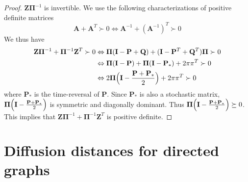 \begin{proof}
  $\mathbf{Z}\bm{\Pi}^{-1}$ is invertible. We use the
  following characterizations of positive definite matrices
  \citep[see][\S
  1.2]{boley09:_gener_laplac,horn94:_topic_in_matrix_analy}
  \begin{equation}
    \label{eq:74}
    \mathbf{A} + \mathbf{A}^{T} \succ 0 \Leftrightarrow
    \mathbf{A}^{-1} + (\mathbf{A}^{-1})^{T} \succ 0
  \end{equation}
  We thus have
  \begin{equation}
    \label{eq:75}
    \begin{split}
   \mathbf{Z}\bm{\Pi}^{-1} + \bm{\Pi}^{-1}\mathbf{Z}^{T} \succ 0
   & \Leftrightarrow \bm{\Pi}(\mathbf{I} - \mathbf{P} + \mathbf{Q}) +
   (\mathbf{I} - \mathbf{P}^{T} + \mathbf{Q}^{T}) \bm{\Pi} \succ 0  \\
   & \Leftrightarrow \bm{\Pi}(\mathbf{I} - \mathbf{P}) +
   \bm{\Pi}(\mathbf{I} - \mathbf{P}_*) + 2 \pi \pi^{T} \succ 0 \\
   & \Leftrightarrow 2 \bm{\Pi}\Bigl(\mathbf{I} - \frac{\mathbf{P} +
     \mathbf{P}_{*}}{2}\Bigr) + 2\pi\pi^{T} \succ 0
   \end{split}
  \end{equation}
  where $\mathbf{P}_*$ is the time-reversal of $\mathbf{P}$. Since
  $\mathbf{P}_{*}$ is also a stochastic matrix,
  $\bm{\Pi}\Bigl(\mathbf{I} - \tfrac{\mathbf{P} +
    \mathbf{P}_*}{2}\Bigr)$ is symmetric and diagonally dominant. Thus
  $\bm{\Pi}\Bigl(\mathbf{I} - \tfrac{\mathbf{P} +
    \mathbf{P}_*}{2}\Bigr) \succeq 0$. This implies that
  $\mathbf{Z}\bm{\Pi}^{-1} + \bm{\Pi}^{-1}\mathbf{Z}^{T}$ is positive
  definite. 
\end{proof}
\section{Diffusion distances for directed graphs}
\label{sec:diff-dist-direct}
